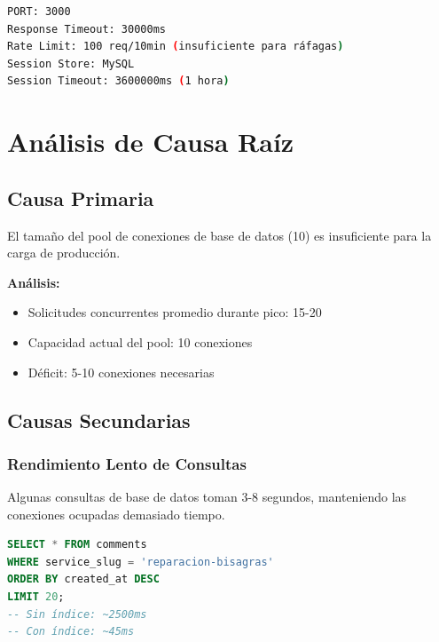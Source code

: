 \documentclass[12pt,a4paper]{article}
\begin{document}
\begin{lstlisting}[language=bash, caption=Config de Express.js]
PORT: 3000
Response Timeout: 30000ms
Rate Limit: 100 req/10min (insuficiente para ráfagas)
Session Store: MySQL
Session Timeout: 3600000ms (1 hora)
\end{lstlisting}

\newpage

\section{Análisis de Causa Raíz}

\subsection{Causa Primaria}

El tamaño del pool de conexiones de base de datos (10) es insuficiente para la carga de producción.

\textbf{Análisis:}
\begin{itemize}
    \item Solicitudes concurrentes promedio durante pico: 15-20
    \item Capacidad actual del pool: 10 conexiones
    \item Déficit: 5-10 conexiones necesarias
\end{itemize}

\subsection{Causas Secundarias}

\subsubsection{Rendimiento Lento de Consultas}

Algunas consultas de base de datos toman 3-8 segundos, manteniendo las conexiones ocupadas demasiado tiempo.

\begin{lstlisting}[language=sql, caption=Ejemplo de consulta lenta (sin índice)]
SELECT * FROM comments 
WHERE service_slug = 'reparacion-bisagras' 
ORDER BY created_at DESC
LIMIT 20;
-- Sin índice: ~2500ms
-- Con índice: ~45ms
\end{lstlisting}
\end{document}
